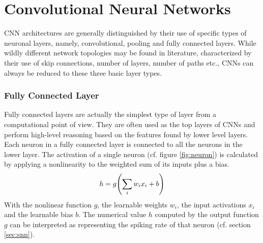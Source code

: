 \section{Convolutional Neural Networks}\label{section:cnn}
CNN architectures are generally distinguished by their use of specific types of neuronal layers, namely, convolutional, pooling and fully connected layers. While wildly different network topologies may be found in literature, characterized by their use of skip connections, number of layers, number of paths etc., CNNs can always be reduced to these three basic layer types.
\subsubsection{Fully Connected Layer}
Fully connected layers are actually the simplest type of layer from a computational point of view. They are often used as the top layers of CNNs and perform high-level reasoning based on the features found by lower level layers. Each neuron in a fully connected layer is connected to all the neurons in the lower layer. The activation of a single neuron (cf. figure \ref{fig:neuron}) is calculated by applying a nonlinearity to the weighted sum of its inputs plus a bias.
\begin{align}
    h = g\qty(\sum_i w_i x_i +b)
    \label{eq:neuron}
\end{align}
With the nonlinear function $g$, the learnable weights $w_i$, the input activations $x_i$ and the learnable bias $b$. The numerical value $h$ computed by the output function $g$ can be interpreted as representing the spiking rate of that neuron (cf. section \ref{sec:snn}).
